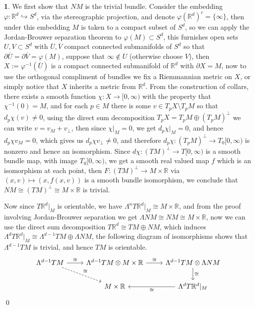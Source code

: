 \documentclass[10.5pt]{article}
\theoremstyle{definition}
\newtheorem{pb}{}
\newcommand{\set}[1]{\{#1\}}
\begin{document}
    \begin{pb}
        We first show that \(NM\) is the trivial bundle. Consider the embedding \(\varphi: \mathbb{R}^d \hookrightarrow S^d\), via the stereographic projection, and denote \(\varphi(\mathbb{R}^d)^c = \set{\infty}\), then under this embedding \(M\) is taken to a compact subset of \(S^d\), so we can apply the Jordan-Brouwer separation theorem to \(\varphi(M) \subset S^d\), this furnishes open sets \(U, V \subset S^d\) with \(\overline{U}, \overline{V}\) compact connected submanifolds of \(S^d\) so that \(\partial \overline{U} = \partial \overline{V} = \varphi(M)\), suppose that \(\infty \not \in U\) (otherwise choose \(V\)), then \(X:= \varphi^{-1}(\overline{U})\) is a compact connected submanifold of \(\mathbb{R}^d\) with \(\partial X = M\), now to use the orthogonal compliment of bundles we fix a Riemmannian metric on \(X\), or simply notice that \(X\) inherits a metric from \(\mathbb{R}^d\). From the construction of collars, there exists a smooth function \(\chi: X \to [0,\infty)\) with the property that \(\chi^{-1}(0) = M\), and for each \(p \in M\) there is some \(v \in T_pX \setminus T_pM\) so that \(d_p\chi(v) \neq 0\), using the direct sum decomposition \(T_pX = T_p M \oplus (T_pM)^\perp\) we can write \(v = v_M + v_\perp\), then since \(\chi\vert_M = 0\), we get \(d_p\chi\vert_M = 0\), and hence \(d_p\chi v_M = 0\), which gives us \(d_p\chi v_\perp \neq 0\), and therefore \(d_p\chi: (T_pM)^\perp \to T_0[0,\infty)\) is nonzero and hence an isomorphism. Since \(d\chi: (TM)^\perp \to T[0,\infty)\) is a smooth bundle map, with image \(T_0[0,\infty)\), we get a smooth real valued map \(f\) which is an isomorphism at each point, then \(F: (TM)^\perp \to M \times \mathbb{R}\) via \((x,v) \mapsto (x,f(x,v))\) is a smooth bundle isomorphism, we conclude that \(NM \cong (TM)^\perp \cong M \times \mathbb{R}\) is trivial.

        Now since \(T \mathbb{R}^d\vert_M\) is orientable, we have \(\Lambda^n T \mathbb{R}^d\vert_M \cong M \times \mathbb{R}\), and from the proof involving Jordan-Brouwer separation we get \(\Lambda NM \cong NM \cong M \times \mathbb{R}\), now we can use the direct sum decomposition \(T \mathbb{R}^d \cong TM \oplus NM\), which induces \(\Lambda^d T \mathbb{R}^d\vert_M \cong \Lambda^{d-1}TM \oplus \Lambda NM\), the following diagram of isomorphisms shows that \(\Lambda^{d-1}TM\) is trivial, and hence \(TM\) is orientable.
        \begin{equation*}
            \begin{tikzcd}
                \Lambda^{d-1}TM \arrow[dr, dashed, "\cong"] \arrow[r,"\cong"] & \Lambda^{d-1}TM \otimes M \times \mathbb{R} \arrow[r,"\cong"] &\Lambda^{d-1}TM \otimes \Lambda NM \arrow[d,"\cong"] \\
                &M \times \mathbb{R} &\Lambda^d T \mathbb{R}^d\vert_M \arrow[l, "\cong"]
            \end{tikzcd}
        \end{equation*} \qed
    \end{pb}
\end{document}
